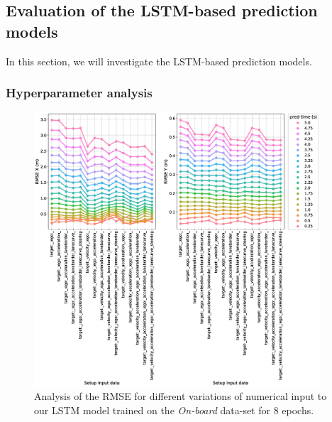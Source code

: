 \subsection{Evaluation of the \acs{LSTM}-based prediction models}%
\label{subsec:evaluation_of_the_lstm_based_prediction_models}

In this section, we will investigate the \ac{LSTM}-based prediction models.

\subsubsection{Hyperparameter analysis}%
\label{ssubsec:hyperparameter_analysis_lstms}

\begin{figure}[t!]
  \centering
  \includegraphics[width=0.95\textwidth]{imgs/lstm_input_data_analysis.eps}
  \caption{Analysis of the \ac{RMSE} for different variations of numerical input to our \ac{LSTM} model trained on the \emph{On-board} data-set for \num{8} epochs.}
  \label{fig:lstm_input_data_analysis}
\end{figure}

